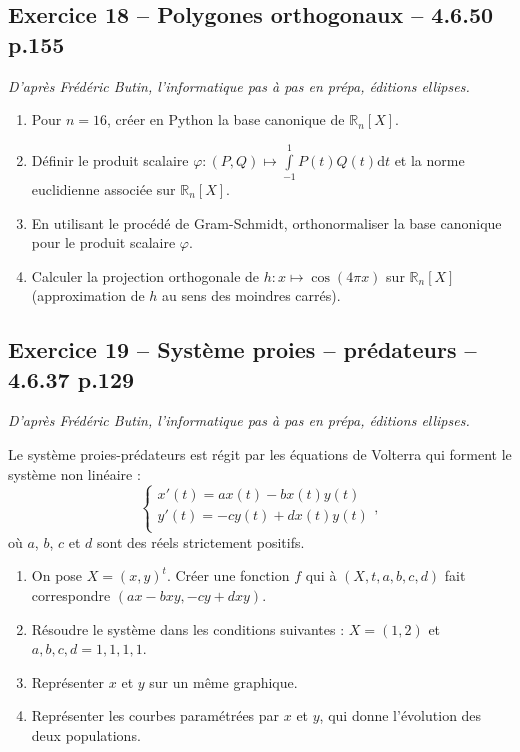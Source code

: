 \documentclass[10pt,fleqn]{article} %
\begin{document}
\begin{multicols}{2}
\subsection*{Exercice 18 -- Polygones orthogonaux -- 4.6.50 p.155}
\begin{flushright}
\textit{D'après Frédéric Butin, l'informatique pas à pas en prépa, éditions ellipses.}
\end{flushright}
\begin{enumerate}
\item Pour $n=16$, créer en Python la base canonique de $\mathbb{R}_n[X]$. 
\item Définir le produit scalaire $\varphi : \left( P,Q\right) \mapsto \int\limits_{-1}^{1} P(t) Q(t) \text{d}t$ et la norme euclidienne associée sur $\mathbb{R}_n[X]$. 
\item En utilisant le procédé de Gram-Schmidt, orthonormaliser la  base canonique pour le produit scalaire $\varphi$.
\item Calculer la projection orthogonale de $h:x\mapsto \cos \left( 4\pi x\right)$ sur $\mathbb{R}_n[X]$ (approximation de $h$ au sens des moindres carrés).
\end{enumerate}


\subsection*{Exercice 19 -- Système proies -- prédateurs -- 4.6.37 p.129}
\begin{flushright}
\textit{D'après Frédéric Butin, l'informatique pas à pas en prépa, éditions ellipses.}
\end{flushright}
Le système proies-prédateurs est régit par les équations de Volterra qui forment le système non linéaire :
$$
\left\{
\begin{array}{l}
x'(t)=ax(t)-bx(t)y(t) \\
y'(t)=-cy(t)+dx(t)y(t) \\
\end{array}
\right. ,
$$
où $a$, $b$, $c$ et $d$ sont des réels strictement positifs. 
\begin{enumerate}
\item On pose $X=(x,y)^t$. Créer une fonction $f$ qui à $(X,t,a,b,c,d)$ fait correspondre $(ax-bxy,-cy+dxy)$.
\item Résoudre le système dans les conditions suivantes : $X=(1,2)$ et $a,b,c,d=1,1,1,1$. 
\item Représenter $x$ et $y$ sur un même graphique. 
\item Représenter les courbes paramétrées par $x$ et $y$, qui donne l'évolution des deux populations.
\end{enumerate}


\end{multicols}
\end{document}

